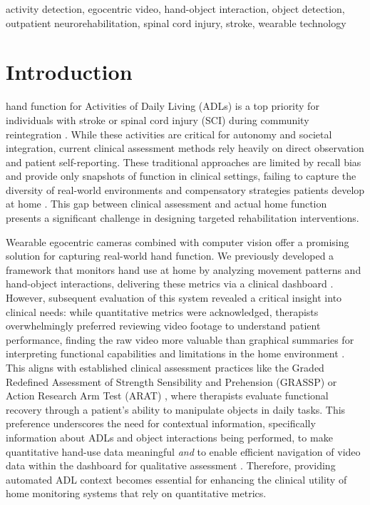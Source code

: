 \documentclass[journal,twoside,web]{ieeecolor}
\begin{document}
\begin{IEEEkeywords}
activity detection, egocentric video, hand-object interaction, object detection, outpatient neurorehabilitation, spinal cord injury, stroke, wearable technology
\end{IEEEkeywords}

\section{Introduction}
 hand function for Activities of Daily Living (ADLs) is a top priority for individuals with stroke or spinal cord injury (SCI) during community reintegration \cite{Anderson2004-ck, Purton2023-ad}. While these activities are critical for autonomy and societal integration, current clinical assessment methods rely heavily on direct observation and patient self-reporting. These traditional approaches are limited by recall bias and provide only snapshots of function in clinical settings, failing to capture the diversity of real-world environments and compensatory strategies patients develop at home \cite{Adams1999-ie}. This gap between clinical assessment and actual home function presents a significant challenge in designing targeted rehabilitation interventions.

Wearable egocentric cameras combined with computer vision offer a promising solution for capturing real-world hand function. We previously developed a framework \cite{Bandini2022-rs} that monitors hand use at home by analyzing movement patterns and hand-object interactions, delivering these metrics via a clinical dashboard \cite{Kadambi2023-iv}. However, subsequent evaluation of this system revealed a critical insight into clinical needs: while quantitative metrics were acknowledged, therapists overwhelmingly preferred reviewing video footage to understand patient performance, finding the raw video more valuable than graphical summaries for interpreting functional capabilities and limitations in the home environment \cite{Kadambi2024-fy}. This aligns with established clinical assessment practices like the Graded Redefined Assessment of Strength Sensibility and Prehension (GRASSP) \cite{Kalsi-Ryan2012-pr} or Action Research Arm Test (ARAT) \cite{Yozbatiran2008-ac}, where therapists evaluate functional recovery through a patient's ability to manipulate objects in daily tasks. This preference underscores the need for contextual information, specifically information about ADLs and object interactions being performed, to make quantitative hand-use data meaningful \textit{and} to enable efficient navigation of video data within the dashboard for qualitative assessment \cite{Kadambi2024-fy}. Therefore, providing automated ADL context becomes essential for enhancing the clinical utility of home monitoring systems that rely on quantitative metrics.
\end{document}
